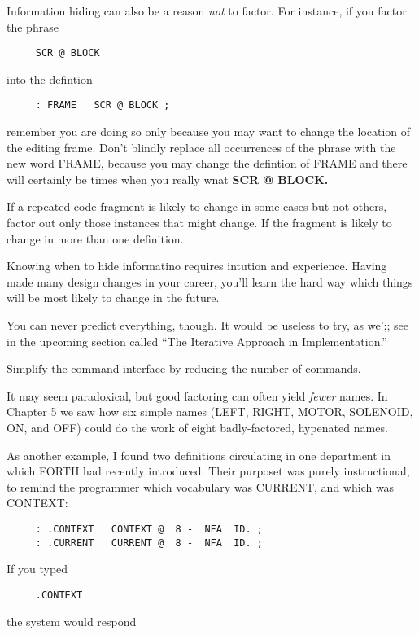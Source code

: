 Information hiding can also be a reason \emph{not} to factor. For instance, if you factor the phrase

\begin{verbatim}
     SCR @ BLOCK
\end{verbatim}
into the defintion

\begin{verbatim}
     : FRAME   SCR @ BLOCK ;
\end{verbatim}
remember you are doing so only because you may want to change the location of the editing frame. Don't blindly replace all occurrences of the phrase with the new word FRAME, because you may change the defintion of FRAME and there will certainly be times when you really wnat \textbf{SCR @ BLOCK.}

\begin{tip}
If a repeated code fragment is likely to change in some cases but not others, factor out only those instances that might change. If the fragment is likely to change in more than one definition.
\end{tip}
Knowing when to hide informatino requires intution and experience. Having made many design changes in your career, you'll learn the hard way which things will be most likely to change in the future.

You can never predict everything, though. It would be useless to try, as we';; see in the upcoming section called ``The Iterative Approach in Implementation.''

\begin{tip}
Simplify the command interface by reducing the number of commands.
\end{tip}
It may seem paradoxical, but good factoring can often yield \emph{fewer} names. In Chapter 5 we saw how six simple names (LEFT, RIGHT, MOTOR, SOLENOID, ON, and OFF) could do the work of eight badly-factored, hypenated names.

As another example, I found two definitions circulating in one department in which FORTH had recently introduced. Their purposet was purely instructional, to remind the programmer which vocabulary was CURRENT, and which was CONTEXT:

\begin{verbatim}
     : .CONTEXT   CONTEXT @  8 -  NFA  ID. ;
     : .CURRENT   CURRENT @  8 -  NFA  ID. ;
\end{verbatim}
If you typed

\begin{verbatim}
     .CONTEXT
\end{verbatim}
the system would respond


